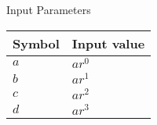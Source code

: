 \setlength{\arrayrulewidth}{0.3mm}
\setlength{\tabcolsep}{12pt}
\renewcommand{\arraystretch}{1.3}


\begin{center}
\caption{Input Parameters}
\begin{tabular}{ |p{2.0cm}|p{2.0cm}| }

\hline
 {Symbol}&{Input value}\\
\hline
$a$ & $ar^0$ \\
\hline
$b$ & $a r^1$ \\
\hline
$c$ & $a r^2$ \\
\hline
$d$ & $a r^3$ \\
\hline

\end{tabular}
\end{center}

